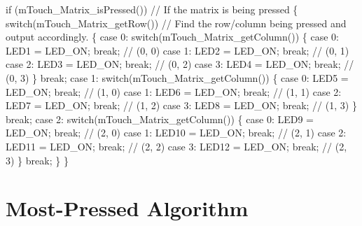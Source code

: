 \begin{DoxyCode}
\textcolor{keywordflow}{if} (mTouch\_Matrix\_isPressed())          \textcolor{comment}{// If the matrix is being pressed}
\{
    \textcolor{keywordflow}{switch}(mTouch\_Matrix\_getRow())      \textcolor{comment}{// Find the row/column being pressed and output accordingly.}
    \{
        \textcolor{keywordflow}{case} 0:                         
            \textcolor{keywordflow}{switch}(mTouch\_Matrix\_getColumn())
            \{
                \textcolor{keywordflow}{case} 0: LED1  = LED\_ON; \textcolor{keywordflow}{break};  \textcolor{comment}{// (0, 0)}
                \textcolor{keywordflow}{case} 1: LED2  = LED\_ON; \textcolor{keywordflow}{break};  \textcolor{comment}{// (0, 1)}
                \textcolor{keywordflow}{case} 2: LED3  = LED\_ON; \textcolor{keywordflow}{break};  \textcolor{comment}{// (0, 2)}
                \textcolor{keywordflow}{case} 3: LED4  = LED\_ON; \textcolor{keywordflow}{break};  \textcolor{comment}{// (0, 3)}
            \}
            \textcolor{keywordflow}{break};
        \textcolor{keywordflow}{case} 1:
            \textcolor{keywordflow}{switch}(mTouch\_Matrix\_getColumn())
            \{
                \textcolor{keywordflow}{case} 0: LED5  = LED\_ON; \textcolor{keywordflow}{break};  \textcolor{comment}{// (1, 0)}
                \textcolor{keywordflow}{case} 1: LED6  = LED\_ON; \textcolor{keywordflow}{break};  \textcolor{comment}{// (1, 1)}
                \textcolor{keywordflow}{case} 2: LED7  = LED\_ON; \textcolor{keywordflow}{break};  \textcolor{comment}{// (1, 2)}
                \textcolor{keywordflow}{case} 3: LED8  = LED\_ON; \textcolor{keywordflow}{break};  \textcolor{comment}{// (1, 3)}
            \}
            \textcolor{keywordflow}{break};
        \textcolor{keywordflow}{case} 2:
            \textcolor{keywordflow}{switch}(mTouch\_Matrix\_getColumn())
            \{
                \textcolor{keywordflow}{case} 0: LED9  = LED\_ON; \textcolor{keywordflow}{break};  \textcolor{comment}{// (2, 0)}
                \textcolor{keywordflow}{case} 1: LED10 = LED\_ON; \textcolor{keywordflow}{break};  \textcolor{comment}{// (2, 1)}
                \textcolor{keywordflow}{case} 2: LED11 = LED\_ON; \textcolor{keywordflow}{break};  \textcolor{comment}{// (2, 2)}
                \textcolor{keywordflow}{case} 3: LED12 = LED\_ON; \textcolor{keywordflow}{break};  \textcolor{comment}{// (2, 3)}
            \}
            \textcolor{keywordflow}{break};
    \}
\}
\end{DoxyCode}
 \hypertarget{featMostPressed}{}\section{Most-\/\+Pressed Algorithm}\label{featMostPressed}
